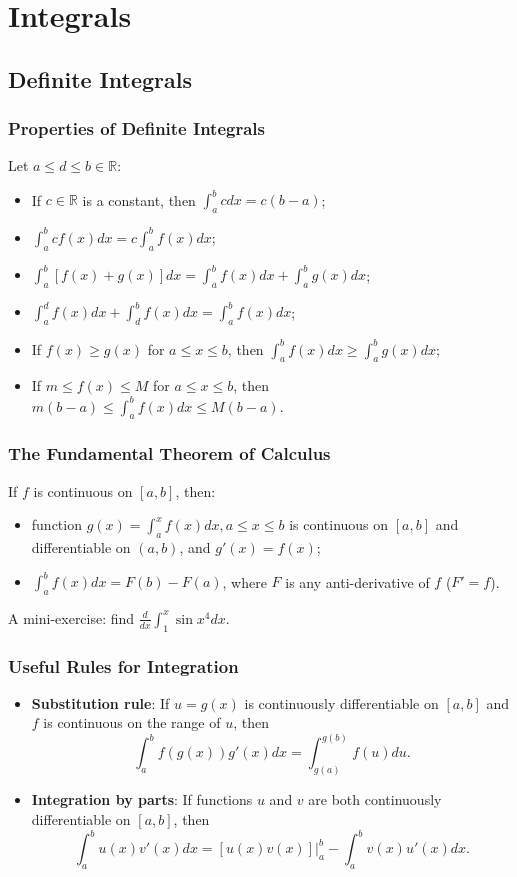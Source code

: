 \documentclass{beamer}
\begin{document}

\section{Integrals}
\subsection{Definite Integrals}
\begin{frame}
\frametitle{Properties of Definite Integrals}
Let $a \leq d \leq b \in \mathbb{R}$:
\begin{itemize}
\item If $c \in \mathbb{R}$ is a constant, then $\int_{a}^b c dx = c(b-a)$;
\item $\int_{a}^b cf(x) dx = c\int_{a}^b f(x) dx$;
\item $\int_{a}^b [f(x)+g(x)] dx = \int_{a}^b f(x) dx + \int_{a}^b g(x) dx$;
\item $\int_{a}^d f(x) dx + \int_{d}^b f(x) dx = \int_{a}^b f(x) dx$;
\item If $f(x) \geq g(x)$ for $a \leq x \leq b$, then $\int_{a}^b f(x) dx \geq \int_{a}^b g(x) dx$;
\item If $m \leq f(x) \leq M$ for $a \leq x \leq b$, then $m(b-a) \leq \int_{a}^b f(x) dx \leq M(b-a)$.
\end{itemize}
\end{frame}

\begin{frame}
\frametitle{The Fundamental Theorem of Calculus}
If $f$ is continuous on $[a,b]$, then:
\begin{itemize}
\item function $g(x) = \int_a^x f(x) dx, a\leq x \leq b$ is continuous on $[a,b]$ and differentiable on $(a,b)$, and $g'(x) = f(x)$;
\item $\int_a^b f(x)dx = F(b)-F(a)$, where $F$ is any anti-derivative of $f$ ($F' = f$).
\end{itemize}
\vspace*{0.15in}
A mini-exercise: 
find $\frac{d}{dx}\int_1^x \sin x^4 dx$.

\end{frame}

\begin{frame}
\frametitle{Useful Rules for Integration}
\begin{itemize}
\item \textbf{Substitution rule}: If $u=g(x)$ is continuously differentiable on $[a,b]$ and $f$ is continuous on the range of $u$, then 
$$
\int_a^b f(g(x))g'(x)dx = \int_{g(a)}^{g(b)} f(u)du.
$$ 
\item \textbf{Integration by parts}: If functions $u$ and $v$ are both continuously differentiable on $[a,b]$, then
$$
\int_{a}^{b} u(x)v'(x)dx = \left .[u(x)v(x)] \right\vert_{a}^{b} - \int_{a}^{b} v(x)u'(x)dx.
$$
\end{itemize}
\end{frame}
\end{document}

